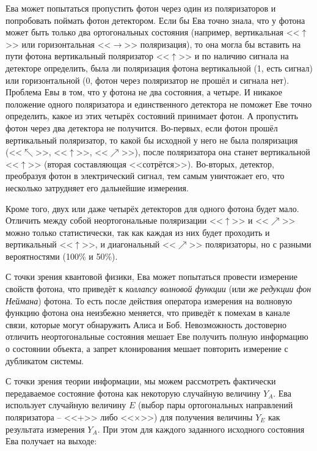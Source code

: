 Ева может попытаться пропустить фотон через один из поляризаторов и попробовать поймать фотон детектором. Если бы Ева точно знала, что у фотона может быть только два ортогональных состояния (например, вертикальная <<$\uparrow$>> или горизонтальная <<$\rightarrow$>> поляризация), то она могла бы вставить на пути фотона вертикальный поляризатор <<$\uparrow$>> и по наличию сигнала на детекторе определить, была ли поляризация фотона вертикальной (1, есть сигнал) или горизонтальной (0, фотон через поляризатор не прошёл и сигнала нет). Проблема Евы в том, что у фотона не два состояния, а четыре. И никакое положение одного поляризатора и единственного детектора не поможет Еве точно определить, какое из этих четырёх состояний принимает фотон. А пропустить фотон через два детектора не получится. Во-первых, если фотон прошёл вертикальный  поляризатор, то какой бы исходной у него не была поляризация (<<$\nwarrow$>>, <<$\uparrow$>>, <<$\nearrow$>>), после поляризатора она станет вертикальной <<$\uparrow$>> (вторая составляющая <<сотрётся>>). Во-вторых, детектор, преобразуя фотон в электрический сигнал, тем самым уничтожает его, что несколько затрудняет его дальнейшие измерения.

Кроме того, двух или даже четырёх детекторов для одного фотона будет мало. Отличить между собой неортогональные поляризации <<$\uparrow$>> и <<$\nearrow$>> можно только статистически, так как каждая из них будет проходить и вертикальный <<$\uparrow$>>, и диагональный <<$\nearrow$>> поляризаторы, но с разными вероятностями (100\% и 50\%).

С точки зрения квантовой физики, Ева может попытаться провести измерение свойств фотона, что приведёт к \emph{коллапсу волновой функции} (или же \emph{редукции фон Неймана}) фотона. То есть после действия оператора измерения на волновую функцию фотона она неизбежно меняется, что приведёт к помехам в канале связи, которые могут обнаружить Алиса и Боб. Невозможность достоверно отличить неортогональные состояния мешает Еве получить полную информацию о состоянии объекта, а запрет клонирования мешает повторить измерение с дубликатом системы.

С точки зрения теории информации, мы можем рассмотреть фактически передаваемое состояние фотона как некоторую случайную величину $Y_A$. Ева использует случайную величину $E$ (выбор пары ортогональных направлений поляризатора – <<+>> либо <<×>>) для получения величины $Y_E$ как результата измерения $Y_A$. При этом для каждого заданного исходного состояния Ева получает на выходе:


